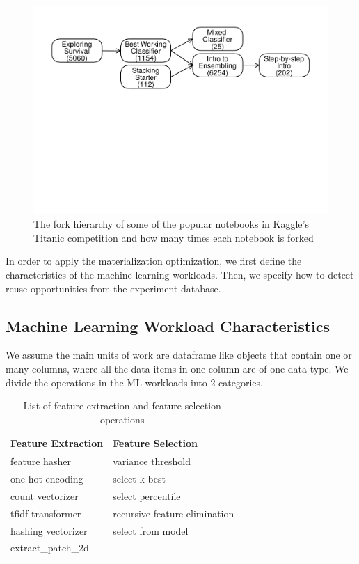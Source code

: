 \begin{figure}
\centering
\includegraphics[width=\columnwidth]{../images/kaggle-titanic-scripts-graph}
\caption{The fork hierarchy of some of the popular notebooks in Kaggle's Titanic competition and how many times each notebook is forked}
\label{fig-titanic-script-hierarchy}
\end{figure}

In order to apply the materialization optimization, we first define the characteristics of the machine learning workloads.
Then, we specify how to detect reuse opportunities from the experiment database.

\subsection{Machine Learning Workload Characteristics}
We assume the main units of work are dataframe like objects that contain one or many columns, where all the data items in one column are of one data type.
We divide the operations in the ML workloads into 2 categories.

\begin{table}
\centering
\begin{tabular}{ll}
\hline
	   Feature Extraction & Feature Selection\\ \hline
        feature hasher & variance threshold  \\
        one hot encoding & select k best \\
        count vectorizer& select percentile \\ 
        tfidf transformer & recursive feature elimination \\
        hashing vectorizer & select from model \\
        extract\_patch\_2d &  \\
        \hline
\end{tabular}
\caption{List of feature extraction and feature selection operations}\label{feature-engineering-operations}
\end{table}

